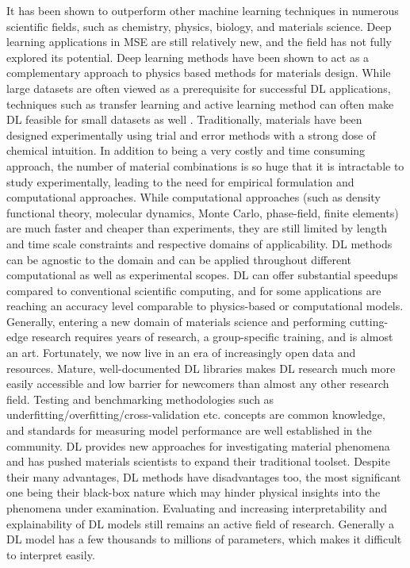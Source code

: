 \documentclass[pdflatex,sn-mathphys]{sn-jnl}%
\theoremstyle{thmstyleone}%
\theoremstyle{thmstyletwo}%
\theoremstyle{thmstylethree}%
\begin{document}
It has been shown to outperform other machine learning techniques in numerous scientific fields, such as chemistry, physics, biology, and materials science\cite{kearnes2016molecular,albrecht2017deep,ge2020deep,agrawal2019deep,erdmann2021deep}. Deep learning applications in MSE are still relatively new, and the field has not fully explored its potential. Deep learning methods have been shown to act as a complementary approach to physics based methods for materials design. While large datasets are often viewed as a prerequisite for successful DL applications, techniques such as transfer learning and active learning method can often make DL  feasible for small datasets as well \cite{chen2019graph,jha2019enhancing,cubuk2019screening}. 
Traditionally, materials have been designed experimentally using trial and error methods with a strong dose of chemical intuition. In addition to being a very costly and time consuming approach, the number of material combinations is so huge that it is intractable to study experimentally, leading to the need for empirical formulation and computational approaches. While computational approaches (such as density functional theory, molecular dynamics, Monte Carlo, phase-field,  finite elements) are much faster and cheaper than experiments, they are still limited by length and time scale constraints and respective domains of applicability. DL methods can be agnostic to the domain and can be applied throughout different computational as well as experimental scopes. DL can offer substantial speedups compared to conventional scientific computing, and for some applications are reaching an accuracy level comparable to physics-based or computational models.
Generally, entering a new domain of materials science and performing cutting-edge research requires years of research, a group-specific training, and is almost an art. Fortunately, we now live in an era of increasingly open data and resources. Mature, well-documented DL libraries makes DL research much more easily accessible and low barrier for newcomers than almost any other research field. Testing and benchmarking methodologies such as underfitting/overfitting/cross-validation \cite{vasudevan2019materials,schmidt2019recent,artrith2021best} etc. concepts are common knowledge, and standards for measuring model performance are well established in the community.
DL provides new approaches for investigating material phenomena and has pushed materials scientists to expand their traditional toolset. 
Despite their many advantages, DL methods have disadvantages too, the most significant one being their black-box nature which may  hinder physical insights into the phenomena under examination. Evaluating and increasing  interpretability and explainability of DL models still remains an active field of research. Generally a DL model has a few thousands to millions of parameters, which makes it difficult to interpret easily.
\end{document}
